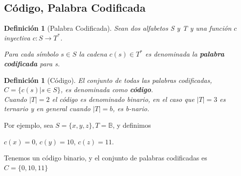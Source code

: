 \documentclass{beamer}
\newtheorem{definicion} [Definicion]{Definición}
\begin{document}
\subsection{Código, Palabra Codificada}

\begin{frame} \small



\begin{definicion} [Palabra Codificada]
Sean dos alfabetos S y T y una función $c$ inyectiva $c: S \rightarrow T^{*}$. 

Para cada símbolo $s\in S$ la cadena $c(s) \in T^{*}$ es denominada la \textbf{palabra codificada} para s. 
\end{definicion}

\begin{definicion} [Código]
El conjunto de todas las palabras codificadas, $C = \{ c(s) | s\in S \}$, es denominada como \textbf{código}.\\
Cuando $|T| = 2$ el código es denominado binario, en el caso que $|T| = 3$ es ternario y en general cuando $|T| = b$, es b-nario.
\end{definicion}
\end{frame}

\begin{frame} 
Por ejemplo, sea $S = \{x,y,z\}, T = \mathbb{B}$, y definimos 

\begin{center}
$c(x) = 0$,	$c(y) = 10$,	$c(z) = 11$. 
\end{center}

Tenemos un código binario, y el conjunto de palabras codificadas es $C = \{0, 10, 11\}$
\end{frame}
\end{document}
